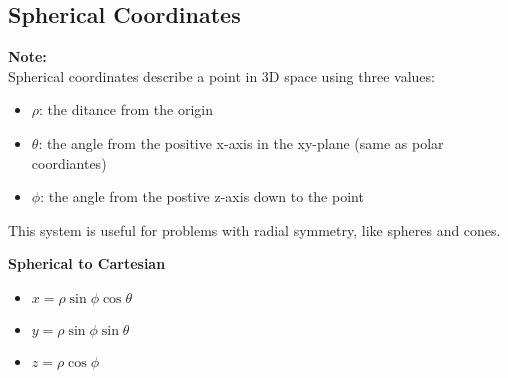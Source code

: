 \documentclass[10pt]{article}                               %
\begin{document}
\begin{defaultbox}
\begin{adjustwidth}{2em}{0pt}
\begin{adjustwidth}{2em}{0pt}
\begin{examplebox}
\begin{adjustwidth}{2em}{0pt}
                \end{adjustwidth}

            \end{examplebox}

        \end{adjustwidth}


        \subsection*{Spherical Coordinates}

        \begin{adjustwidth}{2em}{0pt}

            \begin{notebox}

                \textbf{Note:} \\
                Spherical coordinates describe a point in 3D space using three values:
                        
                \begin{itemize}
                    \item \( \rho \): the ditance from the origin
                    \item \( \theta \): the angle from the positive x-axis in the xy-plane (same as polar coordiantes)
                    \item \( \phi \): the angle from the postive z-axis down to the point
                \end{itemize}

                This system is useful for problems with radial symmetry, like spheres and cones.

            \end{notebox}

            \vspace{0.5em}

            \textbf{Spherical to Cartesian}

                \begin{itemize}
                    \item \( x = \rho\sin\phi\cos\theta \)
                    \item \( y = \rho\sin\phi\sin\theta \)
                    \item \( z = \rho\cos\phi \)
                \end{itemize}

                \vspace{0.5em}


\end{adjustwidth}
\end{adjustwidth}
\end{defaultbox}
\end{document}
